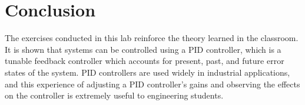 \documentclass[12pt]{article}
\begin{document}
\section*{\fontsize{12}{12}\selectfont \large Conclusion}
The exercises conducted in this lab reinforce the theory learned in the classroom. It is shown
that systems can be controlled using a PID controller, which is a tunable feedback controller which accounts for present, past, and future error states of the system. PID controllers are used widely in industrial applications, and this experience of adjusting a PID controller's gains and observing the effects on the controller is extremely useful to engineering students.





\begin{thebibliography}{2}


\end{thebibliography}




\end{document}
